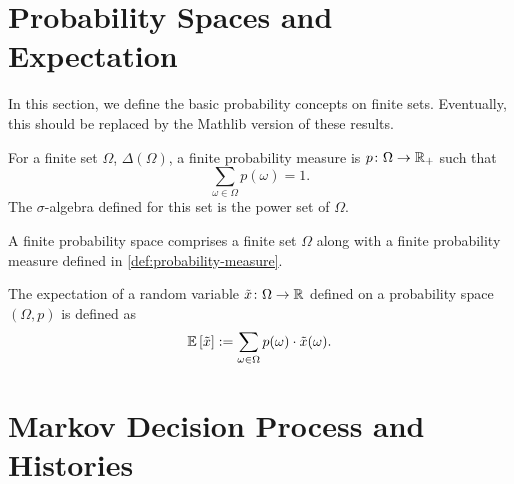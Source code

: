 %


\section{Probability Spaces and Expectation}

In this section, we define the basic probability concepts on finite sets. Eventually, this should be replaced by the Mathlib version of these results.

\begin{definition} \label{def:probability-measure}
  For a finite set $\Omega$, $\Delta(\Omega)$, a finite probability measure is  $p\colon \Omega \to \mathbb{R}_+$ such that
  \[
   \sum_{\omega \in \Omega } p(\omega) = 1. 
 \]
 The $\sigma$-algebra defined for this set is the power set of $\Omega$.
  \leanok
\end{definition}

\begin{definition} \label{def:probability-space}
  A finite probability space comprises a finite set $\Omega$ along with a finite probability measure defined in \cref{def:probability-measure}.
  \leanok
\end{definition}

\begin{definition}[Expectation]
  The expectation of a random variable $\tilde{x} \colon \Omega \to \mathbb{R}$ defined on a probability space $(\Omega, p)$ is defined as
  \[
    \mathbb{E} \left[ \tilde{x} \right] := \sum_{\omega \in \Omega } p(\omega ) \cdot \tilde{x}(\omega).
  \]
  \leanok
\end{definition}

\section{Markov Decision Process and Histories}

